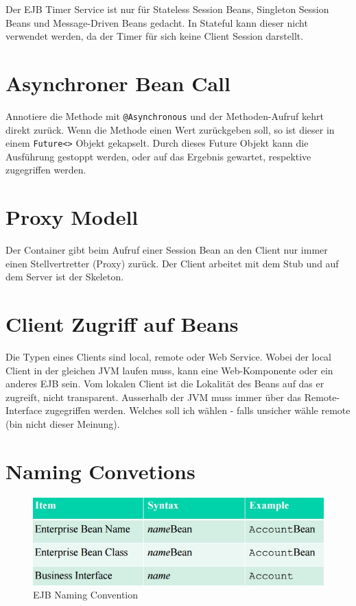 Der EJB Timer Service ist nur für Stateless Session Beans, Singleton Session Beans und Message-Driven Beans gedacht. In Stateful kann dieser nicht verwendet werden, da der Timer für sich keine Client Session darstellt.

\section{Asynchroner Bean Call}
Annotiere die Methode mit \verb|@Asynchronous| und der Methoden-Aufruf kehrt direkt zurück. Wenn die Methode einen Wert zurückgeben soll, so ist dieser in einem \verb|Future<>| Objekt gekapselt. Durch dieses Future Objekt kann die Ausführung gestoppt werden, oder auf das Ergebnis gewartet, respektive zugegriffen werden.

\section{Proxy Modell}
Der Container gibt beim Aufruf einer Session Bean an den Client nur immer einen Stellvertretter (Proxy) zurück. Der Client arbeitet mit dem Stub und auf dem Server ist der Skeleton.

\section{Client Zugriff auf Beans}
Die Typen eines Clients sind local, remote oder Web Service. Wobei der local Client in der gleichen JVM laufen muss, kann eine Web-Komponente oder ein anderes EJB sein. Vom lokalen Client ist die Lokalität des Beans auf das er zugreift, nicht transparent. Ausserhalb der JVM muss immer über das Remote-Interface zugegriffen werden. Welches soll ich wählen - falls unsicher wähle remote (bin nicht dieser Meinung).

\newpage
\section{Naming Convetions}
\begin{figure}[h!]
\centering
\includegraphics[width=0.7\linewidth]{fig/ejb-naming-convention}
\caption{EJB Naming Convention}
\label{fig:ejb-naming-convention}
\end{figure}

